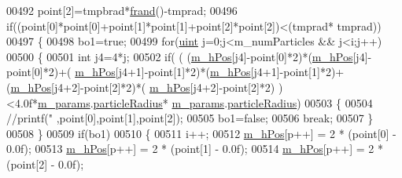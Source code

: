 \begin{DoxyCode}
{00492                                         point[2]=tmpbrad*\hyperlink{particle_system_8cpp_a5459f6b6b39f9a6b80de7f17c3777ee2}{frand}()-tmprad;
00496                                         \textcolor{keywordflow}{if}((point[0]*point[0]+point[1]*point[1]+point[2]*point[2])<(tmprad*
      tmprad))
00497                     \{
00498                         bo1=\textcolor{keyword}{true};
00499                         \textcolor{keywordflow}{for}(\hyperlink{particles__kernel_8cuh_a91ad9478d81a7aaf2593e8d9c3d06a14}{uint} j=0;j<m\_numParticles && j<i;j++)
00500                         \{
00501                                                         \textcolor{keywordtype}{int} j4=4*j;
00502                             \textcolor{keywordflow}{if}( ( (\hyperlink{class_particle_system_ab9d75471d2eaaeb8fa98d2f3f47d9c25}{m\_hPos}[j4]-point[0]*2)*(\hyperlink{class_particle_system_ab9d75471d2eaaeb8fa98d2f3f47d9c25}{m\_hPos}[j4]-point[0]*2)+(
      \hyperlink{class_particle_system_ab9d75471d2eaaeb8fa98d2f3f47d9c25}{m\_hPos}[j4+1]-point[1]*2)*(\hyperlink{class_particle_system_ab9d75471d2eaaeb8fa98d2f3f47d9c25}{m\_hPos}[j4+1]-point[1]*2)+(\hyperlink{class_particle_system_ab9d75471d2eaaeb8fa98d2f3f47d9c25}{m\_hPos}[j4+2]-point[2]*2)*(
      \hyperlink{class_particle_system_ab9d75471d2eaaeb8fa98d2f3f47d9c25}{m\_hPos}[j4+2]-point[2]*2) )<4.0f*\hyperlink{class_particle_system_ab765472aed6a1b5f0d2f98a3a906c417}{m\_params}.\hyperlink{struct_sim_params_a7e131c24e1020c44173deb0f57a8c4af}{particleRadius}*
      \hyperlink{class_particle_system_ab765472aed6a1b5f0d2f98a3a906c417}{m\_params}.\hyperlink{struct_sim_params_a7e131c24e1020c44173deb0f57a8c4af}{particleRadius})
00503                             \{
00504                                                                 \textcolor{comment}{//printf("%
       ,point[0],point[1],point[2]);}
00505                                 bo1=\textcolor{keyword}{false};
00506                                 \textcolor{keywordflow}{break};
00507                             \}
00508                         \}
00509                         \textcolor{keywordflow}{if}(bo1)
00510                                                 \{
00511                         i++;
00512                         \hyperlink{class_particle_system_ab9d75471d2eaaeb8fa98d2f3f47d9c25}{m\_hPos}[p++] = 2 * (point[0] - 0.0f);
00513                         \hyperlink{class_particle_system_ab9d75471d2eaaeb8fa98d2f3f47d9c25}{m\_hPos}[p++] = 2 * (point[1] - 0.0f);
00514                         \hyperlink{class_particle_system_ab9d75471d2eaaeb8fa98d2f3f47d9c25}{m\_hPos}[p++] = 2 * (point[2] - 0.0f);
}
\end{DoxyCode}
